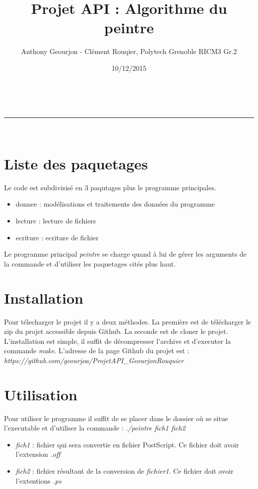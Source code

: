\documentclass[a4paper,11pt]{article}
\makeatletter
\newcommand{\linia}{\rule{\linewidth}{0.5pt}}
\theoremstyle{mytheor}
\renewcommand{\maketitle}{
\begin{center}
\vspace{2ex}
{\huge \textsc{\@title}}
\vspace{1ex}
\\
\linia\\
\@author \hfill \@date
\vspace{4ex}
\end{center}
}
\makeatother
\begin{document}
\title{Projet API : Algorithme du peintre}

\author{Anthony Geourjon - Clément Rouqier, Polytech Grenoble RICM3 Gr.2}

\date{10/12/2015}

\maketitle

\section*{Liste des paquetages}

Le code est subdivisisé en 3 paqutages plus le programme principales.
\begin{itemize}
  \item donnee : modélisations et traitements des données du programme
  \item lecture : lecture de fichiers
  \item ecriture : ecriture de fichier
\end{itemize}
Le programme principal \textit{peintre} se charge quand à lui de gérer les arguments de la commande et d'utiliser les paquetages cités plus haut.


\section*{Installation}
Pour télecharger le projet il y a deux méthodes. La première est de télécharger le zip du projet accessible depuis Github. La seconde est de cloner le projet. L'installation est simple, il suffit de décompresser l'archive et d'executer la commande \textit{make}.
L'adresse de la page Github du projet est : \textit{https://github.com/geourjoa/ProjetAPI\_GeourjonRouquier}

\section*{Utilisation}
Pour utiliser le programme il suffit de se placer dans le dossier où se situe l'executable et d'utiliser la commande : 
\textit{./peintre fich1 fich2} \\

\begin{itemize}
  \item \textit{fich1} : fichier qui sera convertie en fichier PostScript. Ce fichier doit avoir l'extension \textit{.off}
  \item \textit{fich2} : fichier résultant de la conversion de \textit{fichier1}. Ce fichier doit avoir l'extentions \textit{.ps}
\end{itemize}
\end{document}
